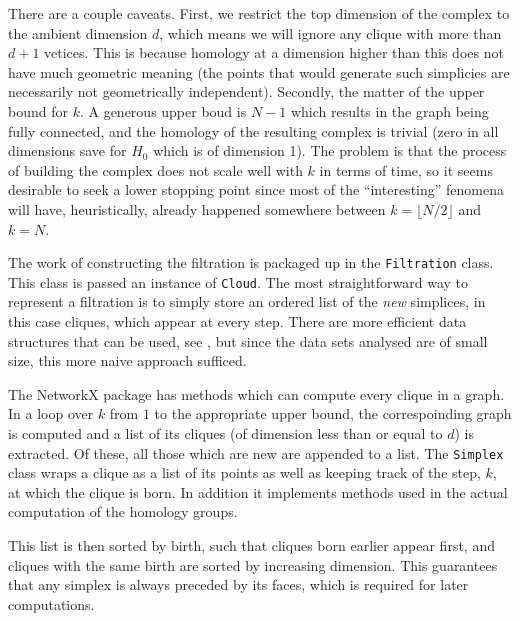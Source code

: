 \documentclass[../main.tex]{subfiles}
\begin{document}
There are a couple caveats. First, we restrict the top dimension of the complex to the
ambient dimension \( d \), which means we will ignore any clique with more than \( d+1 \)
vetices. This is because homology at a dimension higher than this does not have much
geometric meaning (the points that would generate such simplicies are necessarily not
geometrically independent). Secondly, the matter of the upper bound for \( k \). A
generous upper boud is \( N-1 \) which results in the \MKNN graph being fully connected,
and the homology of the resulting complex is trivial (zero in all dimensions save for \(
H_0 \) which is of dimension 1). The problem is that the process of building the complex
does not scale well with \( k \) in terms of time, so it seems desirable to seek a lower
stopping point since most of the ``interesting'' fenomena will have, heuristically, already
happened somewhere between \( k = \lfloor N/2 \rfloor \) and \( k = N \). 

The work of constructing the filtration is packaged up in the \texttt{Filtration} class.
This class is passed an instance of \texttt{Cloud}. The most straightforward way to
represent a filtration is to simply store an ordered list of the \emph{new} simplices, in
this case cliques, which appear at every step. There are more efficient data structures
that can be used, see \cite{efficient, tidyset}, but since the data sets analysed are of small size, this more naive approach sufficed. 

The \textsf{NetworkX} package has methods which can compute every clique in a graph. In a
loop over \( k \) from \( 1 \) to the appropriate upper bound, the correspoinding \MKNN
graph is computed and a list of its cliques (of dimension less than or equal to \( d \))
is extracted. Of these, all those which are new are appended to a list. The
\texttt{Simplex} class wraps a clique as a list of its points as well as keeping track of the
step, \( k \), at which the clique is born. In addition it implements methods used in the
actual computation of the homology groups.

This list is then sorted by birth, such that cliques born earlier appear first, and
cliques with the same birth are sorted by increasing dimension. This guarantees that any
simplex is always preceded by its faces, which is required for later computations. 
\end{document}
